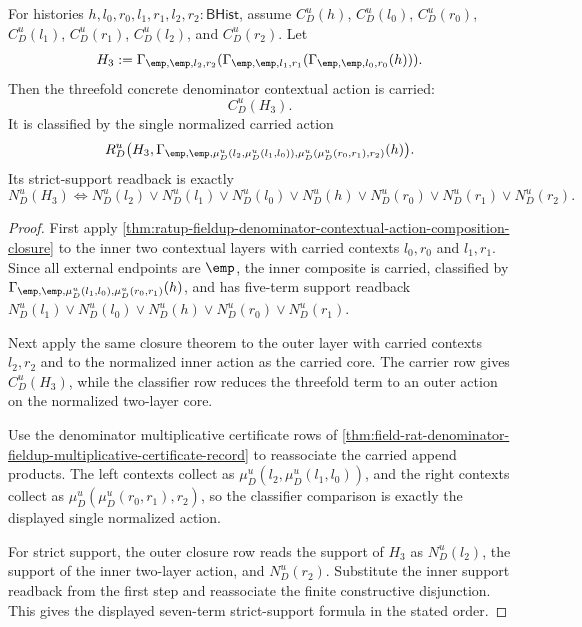 \begin{theorem}
\label{thm:field-rat-denominator-contextual-action-threefold-normalization}
For histories $h,l_0,r_0,l_1,r_1,l_2,r_2:\mathsf{BHist}$, assume
$C_D^u(h)$, $C_D^u(l_0)$, $C_D^u(r_0)$, $C_D^u(l_1)$, $C_D^u(r_1)$,
$C_D^u(l_2)$, and $C_D^u(r_2)$. Let
$$
H_3:=
\Gamma_{\emp,\emp,l_2,r_2}
(\Gamma_{\emp,\emp,l_1,r_1}(\Gamma_{\emp,\emp,l_0,r_0}(h))).
$$
Then the threefold concrete denominator contextual action is carried:
$$
C_D^u(H_3).
$$
It is classified by the single normalized carried action
$$
R_D^u\bigl(H_3,
\Gamma_{\emp,\emp,\mu_D^u(l_2,\mu_D^u(l_1,l_0)),
\mu_D^u(\mu_D^u(r_0,r_1),r_2)}(h)\bigr).
$$
Its strict-support readback is exactly
$$
N_D^u(H_3)
\Longleftrightarrow
N_D^u(l_2)\lor N_D^u(l_1)\lor N_D^u(l_0)\lor N_D^u(h)
\lor N_D^u(r_0)\lor N_D^u(r_1)\lor N_D^u(r_2).
$$
\end{theorem}
\begin{proof}
First apply
\autoref{thm:ratup-fieldup-denominator-contextual-action-composition-closure}
to the inner two contextual layers with carried contexts $l_0,r_0$ and
$l_1,r_1$. Since all external endpoints are $\emp$, the inner composite is
carried, classified by
$\Gamma_{\emp,\emp,\mu_D^u(l_1,l_0),\mu_D^u(r_0,r_1)}(h)$, and has
five-term support readback
$N_D^u(l_1)\lor N_D^u(l_0)\lor N_D^u(h)\lor N_D^u(r_0)\lor N_D^u(r_1)$.

Next apply the same closure theorem to the outer layer with carried contexts
$l_2,r_2$ and to the normalized inner action as the carried core. The carrier
row gives $C_D^u(H_3)$, while the classifier row reduces the threefold term to
an outer action on the normalized two-layer core.

Use the denominator multiplicative certificate rows of
\autoref{thm:field-rat-denominator-fieldup-multiplicative-certificate-record}
to reassociate the carried append products. The left contexts collect as
$\mu_D^u(l_2,\mu_D^u(l_1,l_0))$, and the right contexts collect as
$\mu_D^u(\mu_D^u(r_0,r_1),r_2)$, so the classifier comparison is exactly the
displayed single normalized action.

For strict support, the outer closure row reads the support of $H_3$ as
$N_D^u(l_2)$, the support of the inner two-layer action, and $N_D^u(r_2)$.
Substitute the inner support readback from the first step and reassociate the
finite constructive disjunction. This gives the displayed seven-term
strict-support formula in the stated order.
\end{proof}

